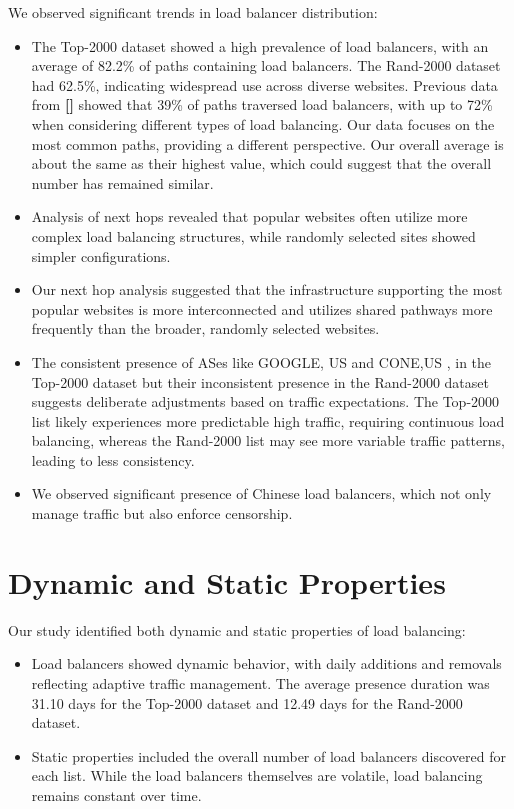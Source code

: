 \documentclass[12pt]{cwru_thesis}
\begin{document}
We observed significant trends in load balancer distribution:
\begin{itemize}
    \item The Top-2000 dataset showed a high prevalence of load balancers, with an average of 82.2\% of paths containing load balancers. The Rand-2000 dataset had 62.5\%, indicating widespread use across diverse websites. Previous data from \textbf{[\cite{augustin2010measuring}]} showed that 39\% of paths traversed load balancers, with up to 72\% when considering different types of load balancing. Our data focuses on the most common paths, providing a different perspective. Our overall average is about the same as their highest value, which could suggest that the overall number has remained similar.
    \item Analysis of next hops revealed that popular websites often utilize more complex load balancing structures, while randomly selected sites showed simpler configurations.
    \item Our next hop analysis suggested that the infrastructure supporting the most popular websites is more interconnected and utilizes shared pathways more frequently than the broader, randomly selected websites.
    \item The consistent presence of ASes like GOOGLE, US and CONE,US , in the Top-2000 dataset but their inconsistent presence in the Rand-2000 dataset suggests deliberate adjustments based on traffic expectations. The Top-2000 list likely experiences more predictable high traffic, requiring continuous load balancing, whereas the Rand-2000 list may see more variable traffic patterns, leading to less consistency.
    \item We observed significant presence of Chinese load balancers, which not only manage traffic but also enforce censorship.
\end{itemize}

\section*{Dynamic and Static Properties}

Our study identified both dynamic and static properties of load balancing:
\begin{itemize}
    \item Load balancers showed dynamic behavior, with daily additions and removals reflecting adaptive traffic management. The average presence duration was 31.10 days for the Top-2000 dataset and 12.49 days for the Rand-2000 dataset.
    \item Static properties included the overall number of load balancers discovered for each list. While the load balancers themselves are volatile, load balancing remains constant over time.
    
\end{itemize}
\end{document}
